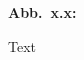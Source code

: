
%


\begin{minipage}{16cm}
\vspace*{8cm}
\parbox{2cm}{{\bf Abb.~x.x:}}
\parbox[t]{12.5cm}
 {  Text  }
\end{minipage}
\vspace*{0.4cm}
